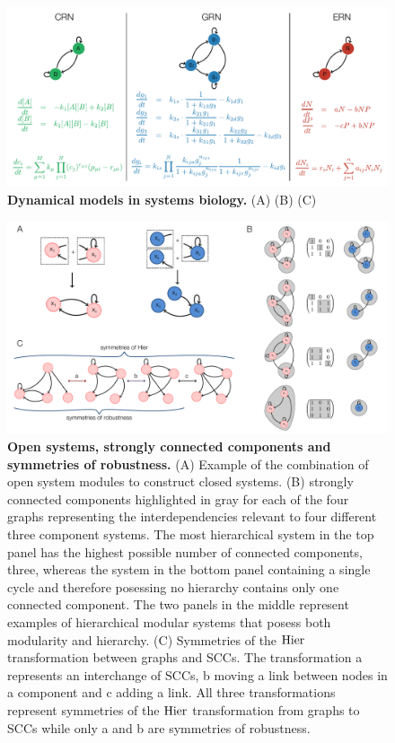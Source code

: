 
\begin{figure}[!ht]
\centering
\noindent\includegraphics[width=0.9\columnwidth]{fig/biomodelexamples.pdf}
\caption{{\bf Dynamical models in systems biology.} (A) (B) (C)}
\label{fig:biomodelexamples}
\end{figure}

\pagebreak

\begin{figure}[!ht]
\centering
\noindent\includegraphics[width=0.9\columnwidth]{fig/modsccsym.pdf}
\caption{{\bf Open systems, strongly connected components and symmetries of robustness.} (A) Example of the combination of open system modules to construct closed systems. (B) strongly connected components highlighted in gray for each of the four graphs representing the interdependencies relevant to four different three component systems. The most hierarchical system in the top panel has the highest possible number of connected components, three, whereas the system in the bottom panel containing a single cycle and therefore posessing no hierarchy contains only one connected component. The two panels in the middle represent examples of hierarchical modular systems that posess both modularity and hierarchy. (C) Symmetries of the $\mathrm{Hier}$ transformation between graphs and SCCs. The transformation a represents an interchange of SCCs, b moving a link between nodes in a component and c adding a link. All three transformations represent symmetries of the $\mathrm{Hier}$ transformation from graphs to SCCs while only a and b are symmetries of robustness.}
\label{fig:modsccsym}
\end{figure}

